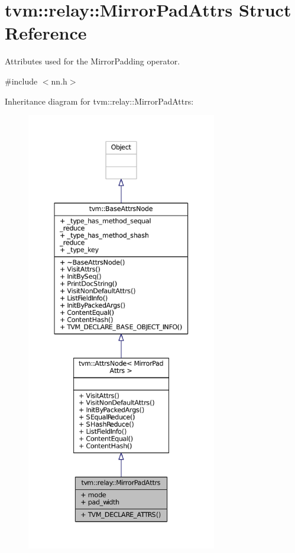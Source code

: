 \hypertarget{structtvm_1_1relay_1_1MirrorPadAttrs}{}\section{tvm\+:\+:relay\+:\+:Mirror\+Pad\+Attrs Struct Reference}
\label{structtvm_1_1relay_1_1MirrorPadAttrs}


Attributes used for the Mirror\+Padding operator.  




{\ttfamily \#include $<$nn.\+h$>$}



Inheritance diagram for tvm\+:\+:relay\+:\+:Mirror\+Pad\+Attrs\+:
\nopagebreak
\begin{figure}[H]
\begin{center}
\leavevmode
\includegraphics[height=550pt]{structtvm_1_1relay_1_1MirrorPadAttrs__inherit__graph}
\end{center}
\end{figure}


